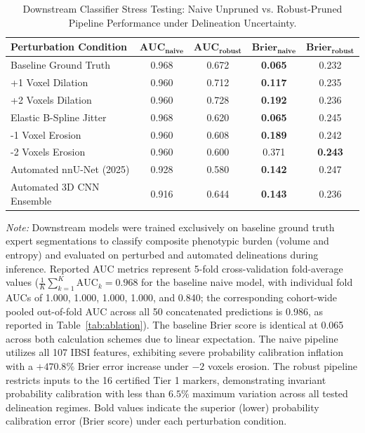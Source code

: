 \begin{table}[htbp]
\centering
\caption{Downstream Classifier Stress Testing: Naive Unpruned vs. Robust-Pruned Pipeline Performance under Delineation Uncertainty.}
\label{tab:stress_test}
\small
\begin{tabular}{lcccc}
\toprule
\textbf{Perturbation Condition} & $\mathbf{AUC_{\text{naive}}}$ & $\mathbf{AUC_{\text{robust}}}$ & $\mathbf{Brier_{\text{naive}}}$ & $\mathbf{Brier_{\text{robust}}}$ \\
\midrule
Baseline Ground Truth & 0.968 & 0.672 & \textbf{0.065} & 0.232 \\
+1 Voxel Dilation & 0.960 & 0.712 & \textbf{0.117} & 0.235 \\
+2 Voxels Dilation & 0.960 & 0.728 & \textbf{0.192} & 0.236 \\
Elastic B-Spline Jitter & 0.968 & 0.620 & \textbf{0.065} & 0.245 \\
-1 Voxel Erosion & 0.960 & 0.608 & \textbf{0.189} & 0.242 \\
-2 Voxels Erosion & 0.960 & 0.600 & 0.371 & \textbf{0.243} \\
Automated nnU-Net (2025) & 0.928 & 0.580 & \textbf{0.142} & 0.247 \\
Automated 3D CNN Ensemble & 0.916 & 0.644 & \textbf{0.143} & 0.236 \\
\bottomrule
\end{tabular}
\begin{flushleft}
\footnotesize \textit{Note:} Downstream models were trained exclusively on baseline ground truth expert segmentations to classify composite phenotypic burden (volume and entropy) and evaluated on perturbed and automated delineations during inference. Reported AUC metrics represent 5-fold cross-validation fold-average values ($\frac{1}{K}\sum_{k=1}^K \text{AUC}_k = 0.968$ for the baseline naive model, with individual fold AUCs of 1.000, 1.000, 1.000, 1.000, and 0.840; the corresponding cohort-wide pooled out-of-fold AUC across all 50 concatenated predictions is 0.986, as reported in Table~\ref{tab:ablation}). The baseline Brier score is identical at 0.065 across both calculation schemes due to linear expectation. The naive pipeline utilizes all 107 IBSI features, exhibiting severe probability calibration inflation with a $+470.8\%$ Brier error increase under $-2$ voxels erosion. The robust pipeline restricts inputs to the 16 certified Tier 1 markers, demonstrating invariant probability calibration with less than $6.5\%$ maximum variation across all tested delineation regimes. Bold values indicate the superior (lower) probability calibration error (Brier score) under each perturbation condition.
\end{flushleft}
\end{table}
